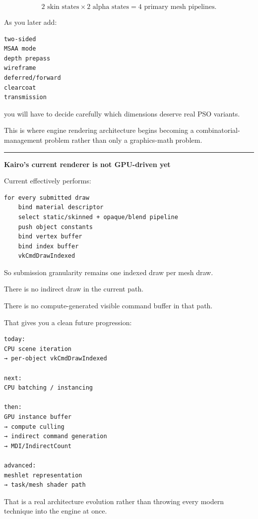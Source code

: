 \[
2\text{ skin states}
\times
2\text{ alpha states}
=
4\text{ primary mesh pipelines}.
\]

As you later add:

\begin{verbatim}
two-sided
MSAA mode
depth prepass
wireframe
deferred/forward
clearcoat
transmission
\end{verbatim}

you will have to decide carefully which dimensions deserve real PSO variants.

This is where engine rendering architecture begins becoming a combinatorial-management problem rather than only a graphics-math problem.

\begin{center}\rule{0.5\linewidth}{0.5pt}\end{center}

\textbf{Kairo's current renderer is not GPU-driven yet}

Current  effectively performs:

\begin{verbatim}
for every submitted draw
    bind material descriptor
    select static/skinned + opaque/blend pipeline
    push object constants
    bind vertex buffer
    bind index buffer
    vkCmdDrawIndexed
\end{verbatim}

So submission granularity remains one indexed draw per mesh draw.

There is no indirect draw in the current  path.

There is no compute-generated visible command buffer in that path.

That gives you a clean future progression:

\begin{verbatim}
today:
CPU scene iteration
→ per-object vkCmdDrawIndexed

next:
CPU batching / instancing

then:
GPU instance buffer
→ compute culling
→ indirect command generation
→ MDI/IndirectCount

advanced:
meshlet representation
→ task/mesh shader path
\end{verbatim}

That is a real architecture evolution rather than throwing every modern technique into the engine at once.

